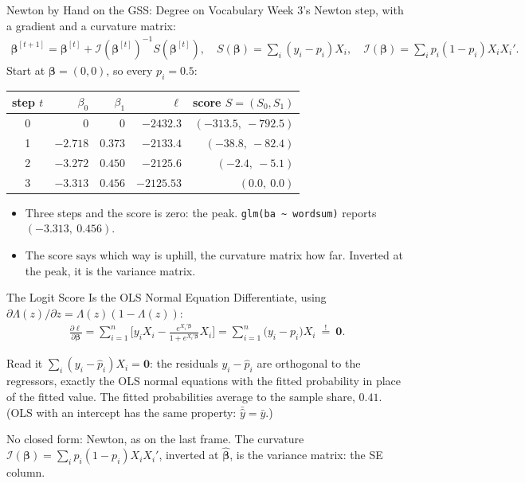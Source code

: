 \documentclass[aspectratio=169,11pt,xcolor=dvipsnames]{beamer}
\newcommand{\zero}{\bm{0}}
\newcommand{\loglik}{\ell}
\newcommand{\Info}{\mathcal{I}}
\begin{document}
\begin{frame}{Newton by Hand on the GSS: Degree on Vocabulary}
Week 3's Newton step, with a gradient and a curvature matrix:
\begingroup
\setlength{\abovedisplayskip}{2pt}\setlength{\belowdisplayskip}{2pt}
\begin{align*}
  \bm\beta^{[t+1]} = \bm\beta^{[t]} + \Info(\bm\beta^{[t]})^{-1} S(\bm\beta^{[t]}),
  \quad
  S(\bm\beta) = \sum_i (y_i - p_i)X_i,
  \quad
  \Info(\bm\beta) = \sum_i p_i(1-p_i)X_iX_i' .
\end{align*}
\endgroup
Start at $\bm\beta = (0, 0)$, so every $p_i = 0.5$:
\begin{center}\small
\renewcommand{\arraystretch}{1.0}
\begin{tabular}{crrrr}
\toprule
step $t$ & $\beta_0$ & $\beta_1$ & $\loglik$ & score $S = (S_0, S_1)$ \\
\midrule
0 & $0$ & $0$ & $-2432.3$ & $(-313.5,\ -792.5)$ \\
1 & $-2.718$ & $0.373$ & $-2133.4$ & $(-38.8,\ -82.4)$ \\
2 & $-3.272$ & $0.450$ & $-2125.6$ & $(-2.4,\ -5.1)$ \\
3 & $-3.313$ & $0.456$ & $-2125.53$ & $(0.0,\ 0.0)$ \\
\bottomrule
\end{tabular}
\end{center}
\begin{itemize}\itemsep1pt
  \item Three steps and the score is zero: the peak.
        \texttt{glm(ba \~{} wordsum)} reports $(-3.313,\ 0.456)$.
  \item The score says which way is uphill, the curvature matrix how far.
        Inverted at the peak, it is the variance matrix.
\end{itemize}
\end{frame}

\begin{frame}{The Logit Score Is the OLS Normal Equation}
Differentiate, using $\partial\Lambda(z)/\partial z = \Lambda(z)(1-\Lambda(z))$:
\begin{align*}
  \frac{\partial\loglik}{\partial\bm\beta}
 = \sum_{i=1}^n \Big[ y_i X_i - \frac{e^{X_i'\bm\beta}}{1+e^{X_i'\bm\beta}}X_i\Big]
 = \sum_{i=1}^n \big(y_i - p_i\big)X_i \ \overset{!} = \ \zero .
\end{align*}
\vskip4pt
\begin{alertblock}{Read it}
$\sum_i (y_i - \hat p_i)X_i = \zero$: the residuals $y_i - \hat p_i$ are
orthogonal to the regressors, \alert{exactly the OLS normal equations} with
the fitted probability in place of the fitted value. The fitted probabilities average to the
sample share, $0.41$. (OLS with an intercept has the same property: $\bar{\hat y} =
\bar y$.)
\end{alertblock}
\vskip3pt
No closed form: Newton, as on the last frame. The curvature
$\Info(\bm\beta) = \sum_i p_i(1-p_i)X_iX_i'$, inverted at $\hat{\bm\beta}$,
is the variance matrix: the SE column.
\end{frame}
\end{document}
